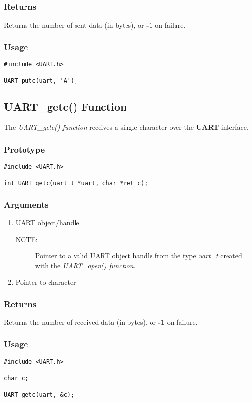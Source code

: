 \documentclass{report}
\begin{document}
\subsubsection*{Returns}
Returns the number of sent data (in bytes), or \textbf{-1} on failure.
\subsubsection*{Usage}
\begin{lstlisting}
#include <UART.h>

UART_putc(uart, 'A');
\end{lstlisting}
\subsection{UART\_getc() Function}
The \textit{UART\_getc() function} receives a single character
over the \textbf{UART} interface.
\subsubsection*{Prototype}
\begin{lstlisting}
#include <UART.h>

int UART_getc(uart_t *uart, char *ret_c);
\end{lstlisting}
\subsubsection*{Arguments}
\begin{enumerate}
\item UART object/handle
\begin{description}
\item[NOTE:] Pointer to a valid UART object handle from the type \textit{uart\_t}
created with the \textit{UART\_open() function}.
\end{description}
\item Pointer to character
\end{enumerate}
\subsubsection*{Returns}
Returns the number of received data (in bytes), or \textbf{-1} on failure.
\subsubsection*{Usage}
\begin{lstlisting}
#include <UART.h>

char c;

UART_getc(uart, &c);
\end{lstlisting}
\end{document}
